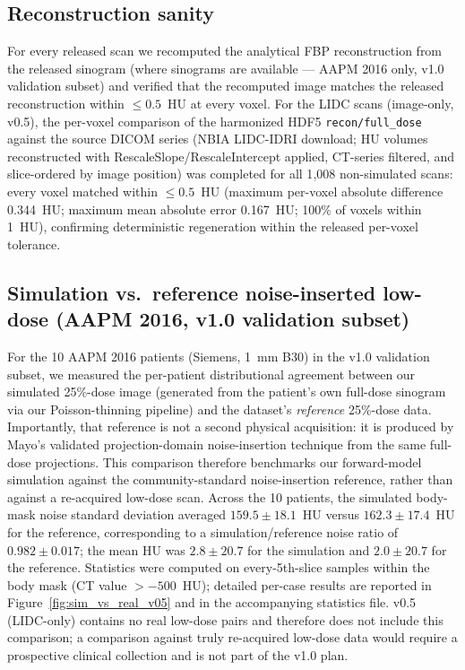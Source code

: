 \documentclass[twoside,11pt]{article}
\begin{document}
\subsection*{Reconstruction sanity}
For every released scan we recomputed the analytical FBP reconstruction from the released sinogram (where sinograms are available --- AAPM 2016 only, v1.0 validation subset) and verified that the recomputed image matches the released reconstruction within $\leq 0.5$~HU at every voxel. For the LIDC scans (image-only, v0.5), the per-voxel comparison of the harmonized HDF5 \texttt{recon/full\_dose} against the source DICOM series (NBIA LIDC-IDRI download; HU volumes reconstructed with RescaleSlope/RescaleIntercept applied, CT-series filtered, and slice-ordered by image position) was completed for all 1{,}008 non-simulated scans: every voxel matched within $\leq 0.5$~HU (maximum per-voxel absolute difference 0.344~HU; maximum mean absolute error 0.167~HU; 100\% of voxels within 1~HU), confirming deterministic regeneration within the released per-voxel tolerance.

\subsection*{Simulation vs.\ reference noise-inserted low-dose (AAPM 2016, v1.0 validation subset)}
For the 10 AAPM 2016 patients (Siemens, 1~mm B30) in the v1.0 validation subset, we measured the per-patient distributional agreement between our simulated 25\%-dose image (generated from the patient's own full-dose sinogram via our Poisson-thinning pipeline) and the dataset's \emph{reference} 25\%-dose data. Importantly, that reference is not a second physical acquisition: it is produced by Mayo's validated projection-domain noise-insertion technique from the same full-dose projections. This comparison therefore benchmarks our forward-model simulation against the community-standard noise-insertion reference, rather than against a re-acquired low-dose scan. Across the 10 patients, the simulated body-mask noise standard deviation averaged $159.5 \pm 18.1$~HU versus $162.3 \pm 17.4$~HU for the reference, corresponding to a simulation/reference noise ratio of $0.982 \pm 0.017$; the mean HU was $2.8 \pm 20.7$ for the simulation and $2.0 \pm 20.7$ for the reference. Statistics were computed on every-5th-slice samples within the body mask (CT value $> -500$~HU); detailed per-case results are reported in Figure~\ref{fig:sim_vs_real_v05} and in the accompanying statistics file. v0.5 (LIDC-only) contains no real low-dose pairs and therefore does not include this comparison; a comparison against truly re-acquired low-dose data would require a prospective clinical collection and is not part of the v1.0 plan.
\end{document}
